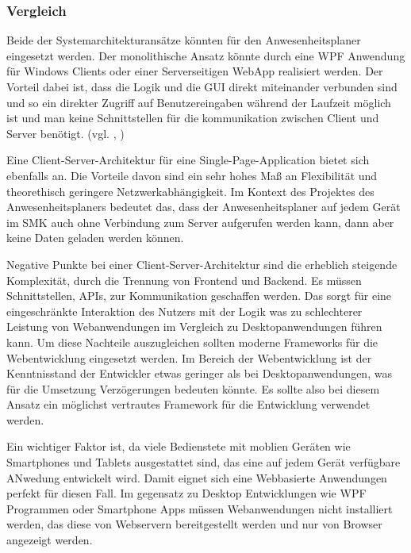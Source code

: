 \subsubsection{Vergleich}
\label{sec:Vergleich}
Beide der Systemarchitekturansätze könnten für den Anwesenheitsplaner eingesetzt werden. Der monolithische Ansatz könnte durch eine WPF Anwendung für Windows Clients oder einer Serverseitigen WebApp realisiert werden. Der Vorteil dabei ist, dass die Logik und die GUI direkt miteinander verbunden sind und so ein direkter Zugriff auf Benutzereingaben während der Laufzeit möglich ist und man keine Schnittstellen für die kommunikation zwischen Client und Server benötigt. (vgl. \cite{wpf}, \cite{modernApp})

Eine Client-Server-Architektur für eine Single-Page-Application bietet sich ebenfalls an. Die Vorteile davon sind ein sehr hohes Maß an Flexibilität und theorethisch geringere Netzwerkabhängigkeit. Im Kontext des Projektes des Anwesenheitsplaners bedeutet das, dass der Anwesenheitsplaner auf jedem Gerät im SMK auch ohne Verbindung zum Server aufgerufen werden kann, dann aber keine Daten geladen werden können. 

Negative Punkte bei einer Client-Server-Architektur sind die erheblich steigende Komplexität, durch die Trennung von Frontend und Backend. Es müssen Schnittstellen, \zB APIs, zur Kommunikation geschaffen werden. Das sorgt für eine eingeschränkte Interaktion des Nutzers mit der Logik was zu schlechterer Leistung von Webanwendungen im Vergleich zu Desktopanwendungen führen kann. Um diese Nachteile auszugleichen sollten moderne Frameworks für die Webentwicklung eingesetzt werden. Im Bereich der Webentwicklung ist der Kenntnisstand der Entwickler etwas geringer als bei Desktopanwendungen, was für die Umsetzung Verzögerungen bedeuten könnte. Es sollte also bei diesem Ansatz ein möglichst vertrautes Framework für die Entwicklung verwendet werden.

Ein wichtiger Faktor ist, da viele Bedienstete mit moblien Geräten wie Smartphones und Tablets ausgestattet sind, das eine auf jedem Gerät verfügbare ANwedung entwickelt wird. Damit eignet sich eine Webbasierte Anwendungen perfekt für diesen Fall. Im gegensatz zu Desktop Entwicklungen wie WPF Programmen oder Smartphone Apps müssen Webanwendungen nicht installiert werden, das diese von Webservern bereitgestellt werden und nur von Browser angezeigt werden.

